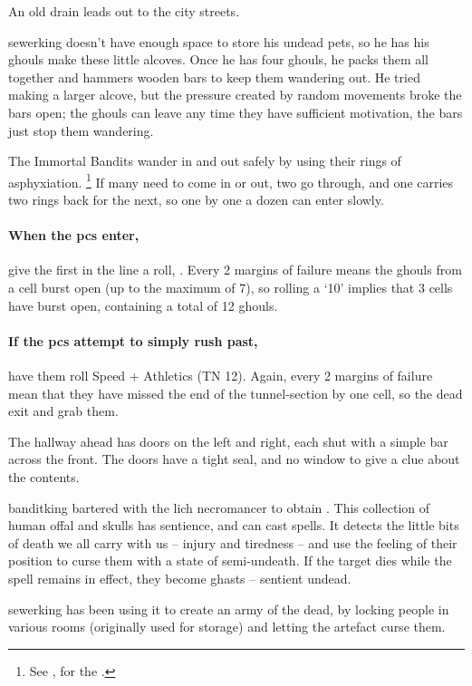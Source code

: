 \label{slum_exit}

An old drain leads out to the city streets.


\Gls{sewerking} doesn't have enough space to store his undead pets, so he has his ghouls make these little alcoves.
Once he has four ghouls, he packs them all together and hammers wooden bars to keep them wandering out.
He tried making a larger alcove, but the pressure created by random movements broke the bars open; the ghouls can leave any time they have sufficient motivation, the bars just stop them wandering.

The Immortal Bandits wander in and out safely by using their rings of asphyxiation.%
\footnote{See , for the .}
If many need to come in or out, two go through, and one carries two rings back for the next, so one by one a dozen can enter slowly.

\paragraph{When the \glspl{pc} enter,}
give the first in the line a  roll, \tn[16].
Every 2 margins of failure means the ghouls from a cell burst open (up to the maximum of 7), so rolling a `10' implies that 3 cells have burst open, containing a total of 12 ghouls.


\paragraph{If the \glspl{pc} attempt to simply rush past,}
have them roll Speed + Athletics (TN 12).
Again, every 2 margins of failure mean that they have missed the end of the tunnel-section by one cell, so the dead exit and grab them.

\begin{boxtext}
  The hallway ahead has doors on the left and right, each shut with a simple bar across the front.
  The doors have a tight seal, and no window to give a clue about the contents.
\end{boxtext}


\begin{exampletext}
  \Gls{banditking} bartered with the lich \gls{necromancer} to obtain .
  This collection of human offal and skulls has sentience, and can cast spells.
  It detects the little bits of death we all carry with us -- injury and tiredness -- and use the feeling of their position to curse them with a state of semi-undeath.
  If the target dies while the spell remains in effect, they become ghasts -- sentient undead.%

  \Gls{sewerking} has been using it to create an army of the dead, by locking people in various rooms (originally used for storage) and letting the \gls{artefact} curse them.
\end{exampletext}

